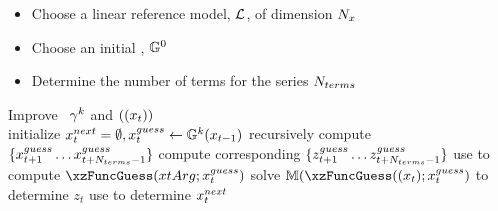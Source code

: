 \documentclass[tikz]{beamer}
\begin{document}
\begin{frame}[fragile]
  \begin{itemize}
  \item Choose a linear reference  model, ${\mathcal{L}}$, of dimension ${N_x}$
\item Choose an initial \ADRUE,  ${\mathbb{G}}^0$
\item Determine the number of terms for the series ${N_{terms}}$
  \end{itemize}
  \begin{algorithm}[H]{Improve \ADRUE\ ${{\gamma}}^k$ and $({(x_{t}) })$}
\\
initialize $x^{next}_{t}=\emptyset, x^{guess}_{t}\leftarrow {\mathbb{G}}^k(x_{t-1})$\;
{recursively compute $\{x^{guess}_{t+1}\ldots x^{guess}_{t+{N_{terms}}-1}\}$\;
compute corresponding $\{z^{guess}_{t+1}\ldots z^{guess}_{t+{N_{terms}}-1}\}$\;
use  to compute $\xzFuncGuess(xtArg;\xgusst{t})$\;
solve $\eqnFunc(\xzFuncGuess(\xtArg;\xgusst{t})$ to determine $z_t$\;
use  to determine $x^{next}_{t}$\;
}
\end{algorithm}
\end{frame}
\end{document}
